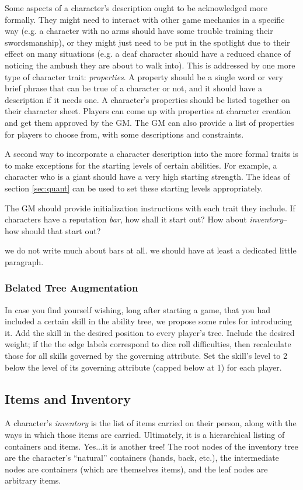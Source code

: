 \documentclass[12pt]{article}
\newcommand{\notes}[1]{{\color{Tan} #1}}
\newcommand{\emdex}[1]{\emph{#1}\index{#1}}
\begin{document}
Some aspects of a character's description ought to be acknowledged more formally.
They might need to interact with other game mechanics
in a specific way (e.g. a character with no arms should have some trouble training their swordsmanship),
or they might just need to be put in the spotlight due to their effect on many situations
(e.g. a deaf character should have a reduced chance of noticing the ambush they are about to walk into).
This is addressed by one more type of character trait: \emph{properties}.
A property should be a single word or very brief phrase that can be true of a character or not,
and it should have a description if it needs one.
A character's properties should be listed together on their character sheet.
Players can come up with properties at character creation and get them approved by the GM.
The GM can also provide a list of properties for players to choose from, with some descriptions and constraints.

A second way to incorporate a character description into the more formal traits
is to make exceptions for the starting levels of certain abilities.
For example, a character who is a giant should have a very high starting strength.
The ideas of section \ref{sec:quant} can be used to set these starting levels appropriately.

The GM should provide initialization instructions with each trait they include.
If characters have a reputation \emph{bar}, how shall it start out?
How about \emph{inventory}--how should that start out?

\notes{we do not write much about bars at all. we should have at least a dedicated little paragraph.}

\subsubsection{Belated Tree Augmentation}\label{sec:bta}

In case you find yourself wishing, long after starting a game,
that you had included a certain skill in the ability tree,
we propose some rules for introducing it.
Add the skill in the desired position to every player's tree.
Include the desired weight;
if the the edge labels correspond to dice roll difficulties, then recalculate those for all skills governed by the governing attribute.
Set the skill's level to 2 below the level of its governing attribute (capped below at 1) for each player.




\subsection{Items and Inventory} \label{sec:items}
A character's \emdex{inventory} is the list of items carried on their person,
along with the ways in which those items are carried.
Ultimately, it is a hierarchical listing of containers and items.
Yes...it is another tree!
The root nodes of the inventory tree are the character's ``natural'' containers (hands, back, etc.),
the intermediate nodes are containers (which are themselves items),
and the leaf nodes are arbitrary items.
\end{document}
